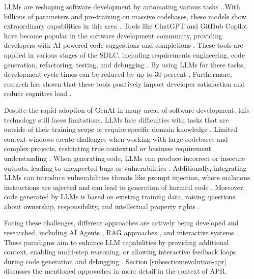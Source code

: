 \acp{LLM} are reshaping software development by automating various tasks \cite{houLargeLanguageModels2024}. With billions of parameters and pre-training on massive codebases, these models show extraordinary capabilities in this area \cite{chenUnveilingPitfallsUnderstanding2025}. Tools like ChatGPT \cite{IntroducingChatGPT2024} and GitHub Copilot \cite{dohmkeGitHubCopilotMeet2025} have become popular in the software development community, providing developers with AI-powered code suggestions and completions \cite{bhargavmallampatiRoleGenerativeAI2025}. These tools are applied in various stages of the \ac{SDLC}, including requirements engineering, code generation, refactoring, testing, and debugging \cite{houLargeLanguageModels2024, puvvadiCodingAgentsComprehensive2025, bhargavmallampatiRoleGenerativeAI2025}. By using \acp{LLM} for these tasks, development cycle times can be reduced by up to 30 percent \cite{bhargavmallampatiRoleGenerativeAI2025, kalliamvakouResearchQuantifyingGitHub2022}. Furthermore, research has shown that these tools positively impact developer satisfaction and reduce cognitive load \cite{kalliamvakouResearchQuantifyingGitHub2022}.

Despite the rapid adoption of \ac{GenAI} in many areas of software development, this technology still faces limitations. \acp{LLM} face difficulties with tasks that are outside of their training scope or require specific domain knowledge \cite{houLargeLanguageModels2024}. Limited context windows create challenges when working with large codebases and complex projects, restricting true contextual or business requirement understanding \cite{bhargavmallampatiRoleGenerativeAI2025}. When generating code, \acp{LLM} can produce incorrect or insecure outputs, leading to unexpected bugs or vulnerabilities \cite{houLargeLanguageModels2024, bhargavmallampatiRoleGenerativeAI2025}. Additionally, integrating \acp{LLM} can introduce vulnerabilities threats like prompt injection, where malicious instructions are injected and can lead to generation of harmful code \cite{liuPromptInjectionAttack2024}. Moreover, code generated by \acp{LLM} is based on existing training data, raising questions about ownership, responsibility, and intellectual property rights \cite{sauvolaFutureSoftwareDevelopment2024, houLargeLanguageModels2024}.

Facing these challenges, different approaches are actively being developed and researched, including \ac{AI} Agents \cite{liuMarsCodeAgentAInative2024, yangSWEagentAgentComputerInterfaces2024}, \ac{RAG} approaches \cite{xiaAgentlessDemystifyingLLMbased2024}, and interactive systems \cite{xiaAutomatedProgramRepair2024}. These paradigms aim to enhance LLM capabilities by providing additional context, enabling multi-step reasoning, or allowing interactive feedback loops during code generation and debugging \cite{houLargeLanguageModels2024, puvvadiCodingAgentsComprehensive2025}. Section \ref{subsection:evolution-apr} discusses the mentioned approaches in more detail in the context of \ac{APR}.

